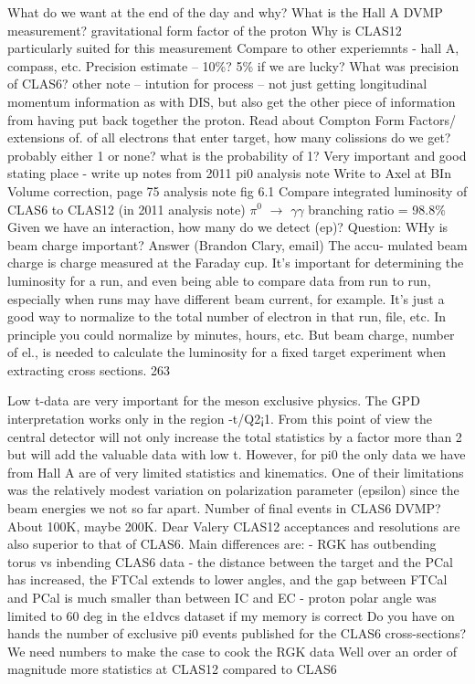 What do we want at the end of the day and why?
What is the Hall A DVMP measurement? gravitational form factor of the proton Why is
CLAS12 particularly suited for this measurement Compare to other experiemnts - hall A,
compass, etc. Precision estimate – 10\%? 5\% if we are lucky? What was precision of CLAS6?
other note – intution for process – not just getting longitudinal momentum information as
with DIS, but also get the other piece of information from having put back together the
proton. Read about Compton Form Factors/ extensions of. of all electrons that enter target,
how many colissions do we get? probably either 1 or none? what is the probability of 1?
Very important and good stating place - write up notes from 2011 pi0 analysis note
Write to Axel at BIn Volume correction, page 75 analysis note fig 6.1
Compare integrated luminosity of CLAS6 to CLAS12 (in 2011 analysis note)
$\pi^0$ $\rightarrow$ $\gamma$$\gamma$ branching ratio = 98.8\%
Given we have an interaction, how many do we detect (ep)?
Question: WHy is beam charge important? Answer (Brandon Clary, email) The accu-
mulated beam charge is charge measured at the Faraday cup. It’s important for determining
the luminosity for a run, and even being able to compare data from run to run, especially
when runs may have different beam current, for example. It’s just a good way to normalize
to the total number of electron in that run, file, etc. In principle you could normalize by
minutes, hours, etc. But beam charge, number of el., is needed to calculate the luminosity
for a fixed target experiment when extracting cross sections.
263

Low t-data are very important for the meson exclusive physics. The GPD interpretation
works only in the region -t/Q2¡1. From this point of view the central detector will not only
increase the total statistics by a factor more than 2 but will add the valuable data with low
t.
However, for pi0 the only data we have from Hall A are of very limited statistics and
kinematics. One of their limitations was the relatively modest variation on polarization
parameter (epsilon) since the beam energies we not so far apart.
Number of final events in CLAS6 DVMP? About 100K, maybe 200K.
Dear Valery
CLAS12 acceptances and resolutions are also superior to that of CLAS6. Main differences
are: - RGK has outbending torus vs inbending CLAS6 data - the distance between the target
and the PCal has increased, the FTCal extends to lower angles, and the gap between FTCal
and PCal is much smaller than between IC and EC - proton polar angle was limited to 60
deg in the e1dvcs dataset if my memory is correct
Do you have on hands the number of exclusive pi0 events published for the CLAS6
cross-sections? We need numbers to make the case to cook the RGK data
Well over an order of magnitude more statistics at CLAS12 compared to CLAS6



